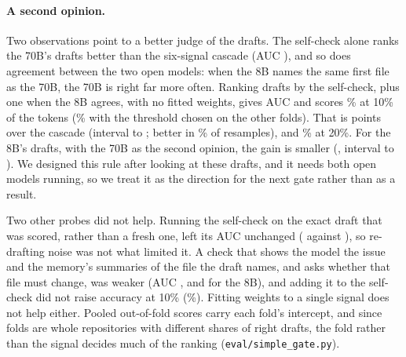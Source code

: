 \documentclass[10pt,twocolumn]{article}
\begin{document}
\paragraph{A second opinion.} Two observations point to a better judge of the drafts. The self-check alone ranks the 70B's drafts better than the six-signal cascade (AUC \rawSelfBigAuc), and so does agreement between the two open models: when the 8B names the same first file as the 70B, the 70B is right far more often. Ranking drafts by the self-check, plus one when the 8B agrees, with no fitted weights, gives AUC \secondBigAuc{} and scores \secondBigTen\% at 10\% of the tokens (\secondBigTenNested\% with the threshold chosen on the other folds). That is \secondBigGain{} points over the cascade (interval \secondBigGainLo{} to \secondBigGainHi; better in \secondBigGainP\% of resamples), and \secondBigTwenty\% at 20\%. For the 8B's drafts, with the 70B as the second opinion, the gain is smaller (\secondSmallGain, interval \secondSmallGainLo{} to \secondSmallGainHi). We designed this rule after looking at these drafts, and it needs both open models running, so we treat it as the direction for the next gate rather than as a result.

Two other probes did not help. Running the self-check on the exact draft that was scored, rather than a fresh one, left its AUC unchanged (\bigExactSelfAuc{} against \rawSelfBigAuc), so re-drafting noise was not what limited it. A check that shows the model the issue and the memory's summaries of the file the draft names, and asks whether that file must change, was weaker (AUC \bigEvidenceAuc, and \smallEvidenceAuc{} for the 8B), and adding it to the self-check did not raise accuracy at 10\% (\bigSelfEvidenceTen\%). Fitting weights to a single signal does not help either. Pooled out-of-fold scores carry each fold's intercept, and since folds are whole repositories with different shares of right drafts, the fold rather than the signal decides much of the ranking (\texttt{eval/simple\_gate.py}).
\end{document}
